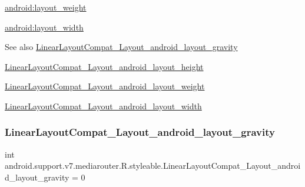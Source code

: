 {\ttfamily \hyperlink{classandroid_1_1support_1_1v7_1_1mediarouter_1_1R_1_1styleable_a08568351b29f3190bab90995aa954fef}{android\+:layout\+\_\+weight}}

{\ttfamily \hyperlink{classandroid_1_1support_1_1v7_1_1mediarouter_1_1R_1_1styleable_a50f6347a18dd6c05c35557a22815688a}{android\+:layout\+\_\+width}}

\begin{DoxySeeAlso}{See also}
\hyperlink{classandroid_1_1support_1_1v7_1_1mediarouter_1_1R_1_1styleable_aa6fdf2458c85c1826fa468547aaf9215}{Linear\+Layout\+Compat\+\_\+\+Layout\+\_\+android\+\_\+layout\+\_\+gravity} 

\hyperlink{classandroid_1_1support_1_1v7_1_1mediarouter_1_1R_1_1styleable_afc7e0bb6cbbe6db8125e2377fa0da82b}{Linear\+Layout\+Compat\+\_\+\+Layout\+\_\+android\+\_\+layout\+\_\+height} 

\hyperlink{classandroid_1_1support_1_1v7_1_1mediarouter_1_1R_1_1styleable_a08568351b29f3190bab90995aa954fef}{Linear\+Layout\+Compat\+\_\+\+Layout\+\_\+android\+\_\+layout\+\_\+weight} 

\hyperlink{classandroid_1_1support_1_1v7_1_1mediarouter_1_1R_1_1styleable_a50f6347a18dd6c05c35557a22815688a}{Linear\+Layout\+Compat\+\_\+\+Layout\+\_\+android\+\_\+layout\+\_\+width} 
\end{DoxySeeAlso}
\mbox{\label{classandroid_1_1support_1_1v7_1_1mediarouter_1_1R_1_1styleable_aa6fdf2458c85c1826fa468547aaf9215}} 
\subsubsection{\texorpdfstring{Linear\+Layout\+Compat\+\_\+\+Layout\+\_\+android\+\_\+layout\+\_\+gravity}{LinearLayoutCompat\_Layout\_android\_layout\_gravity}}
{\footnotesize\ttfamily int android.\+support.\+v7.\+mediarouter.\+R.\+styleable.\+Linear\+Layout\+Compat\+\_\+\+Layout\+\_\+android\+\_\+layout\+\_\+gravity = 0\hspace{0.3cm}{\ttfamily [static]}}

